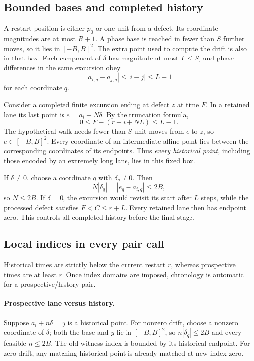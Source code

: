 \documentclass[11pt,letterpaper]{article}
\theoremstyle{definition}\newtheorem{definition}[theorem]{Definition}
\theoremstyle{remark}\newtheorem{remark}[theorem]{Remark}
\begin{document}
\subsection{Bounded bases and completed history}
A restart position is either $p_0$ or one unit from a defect. Its coordinate magnitudes are at most $R+1$. A phase base is reached in fewer than $S$ further moves, so it lies in $[-B,B]^2$. The extra point used to compute the drift is also in that box. Each component of $\delta$ has magnitude at most $L\le S$, and phase differences in the same excursion obey
\begin{equation}\label{ptr:eq:phasebound}
 |a_{i,q}-a_{j,q}|\le|i-j|\le L-1
\end{equation}
for each coordinate $q$.

Consider a completed finite excursion ending at defect $z$ at time $F$. In a retained lane its last point is $e=a_i+N\delta$. By the truncation formula,
\[
 0\le F-(r+i+NL)\le L-1.
\]
The hypothetical walk needs fewer than $S$ unit moves from $e$ to $z$, so $e\in[-B,B]^2$. Every coordinate of an intermediate affine point lies between the corresponding coordinates of its endpoints. Thus \emph{every historical point}, including those encoded by an extremely long lane, lies in this fixed box.

If $\delta\ne0$, choose a coordinate $q$ with $\delta_q\ne0$. Then
\[
 N|\delta_q|=|e_q-a_{i,q}|\le2B,
\]
so $N\le2B$. If $\delta=0$, the excursion would revisit its start after $L$ steps, while the processed defect satisfies $F<C\le r+L$. Every retained lane then has endpoint zero. This controls all completed history before the final stage.

\subsection{Local indices in every pair call}
Historical times are strictly below the current restart $r$, whereas prospective times are at least $r$. Once index domains are imposed, chronology is automatic for a prospective/history pair.

\paragraph{Prospective lane versus history.}
Suppose $a_i+n\delta=y$ is a historical point. For nonzero drift, choose a nonzero coordinate of $\delta$; both the base and $y$ lie in $[-B,B]^2$, so $n|\delta_q|\le2B$ and every feasible $n\le2B$. The old witness index is bounded by its historical endpoint. For zero drift, any matching historical point is already matched at new index zero.
\end{document}
